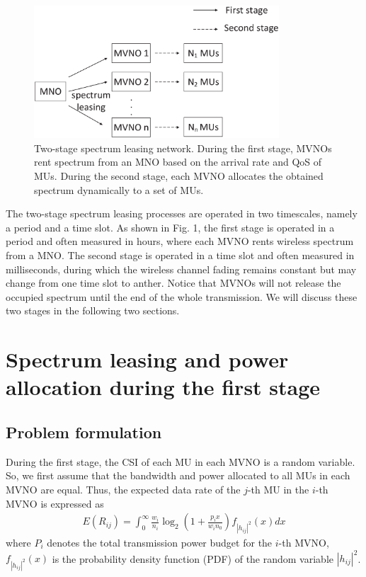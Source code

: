 \documentclass[journal]{IEEEtran}
\begin{document}
\begin{figure}
	\centering
	\includegraphics[width=3.6in]{Pic}
	\caption{Two-stage spectrum leasing network. During the first stage, MVNOs rent spectrum from an MNO based on the arrival rate and QoS of MUs. During the second stage, each MVNO allocates the obtained spectrum dynamically to a set of MUs.}
\end{figure}
The two-stage spectrum leasing processes are operated in two timescales, namely a period and a time slot. As shown in Fig. 1, the first stage is operated in a period and often measured in hours, where each MVNO rents wireless spectrum from a MNO. The second stage is operated in a time slot and often measured in milliseconds, during which the  wireless channel fading remains constant but may change from one time slot to anther. Notice that MVNOs will not release the occupied spectrum until the end of the whole transmission. We will discuss these two stages in the following two sections.

\section{Spectrum leasing and power allocation during the first stage}

\subsection{Problem formulation}
During the first stage, the CSI of each MU in each MVNO is a random variable. So, we first assume that the bandwidth and power allocated to all MUs in each MVNO are equal. Thus, the expected data rate of the $j$-th MU in the $i$-th MVNO is expressed as
\begin{align}
E\left({R}_{ij}\right) = \int_{0}^{\infty} \frac{w_i}{n_i} \log_2\left(1 + \frac{p_i x}{w_i n_0}\right) f_{\left|h_{ij} \right|^2} \left(x\right)dx
\end{align}
where $P_i$ denotes the total transmission power budget for the $i$-th MVNO, $f_{\left|h_{ij} \right|^2} \left(x\right)$ is the probability density function (PDF) of the random variable $\left|h_{ij} \right|^2$. 
\end{document}
